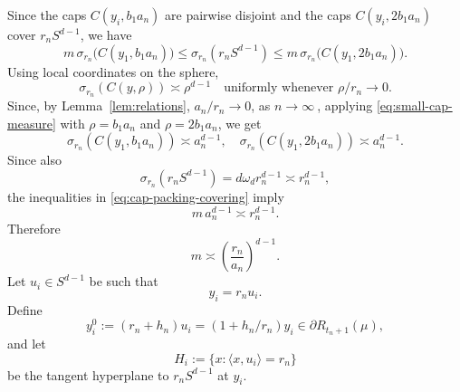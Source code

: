 \documentclass[10pt]{amsart}
\newcommand{\1}{\textbf{1}}
\numberwithin{equation}{section} %
\theoremstyle{remark}
\theoremstyle{definition}
\begin{document}
Since the caps \(C(y_i,b_1a_n)\) are pairwise disjoint and the caps \(C(y_i,2b_1a_n)\) cover \(r_nS^{d-1}\), we have
\begin{equation}\label{eq:cap-packing-covering}
m\,\sigma_{r_n}\bigl(C(y_1,b_1a_n)\bigr)
\le
\sigma_{r_n}(r_nS^{d-1})
\le
m\,\sigma_{r_n}\bigl(C(y_1,2b_1a_n)\bigr).
\end{equation}
Using local coordinates on the sphere,
\begin{equation}\label{eq:small-cap-measure}
\sigma_{r_n}(C(y,\rho))\asymp \rho^{d-1}
\quad\text{uniformly whenever } \rho/r_n\to0.
\end{equation}
Since, by Lemma~\ref{lem:relations}, $a_n/r_n \to 0$, as $ n \to \infty \ $, applying \eqref{eq:small-cap-measure} with \(\rho=b_1a_n\) and \(\rho=2b_1a_n\), we get
\[
\sigma_{r_n}(C(y_1,b_1a_n))\asymp a_n^{d-1},
\quad
\sigma_{r_n}(C(y_1,2b_1a_n))\asymp a_n^{d-1}.
\]
Since also
\[
\sigma_{r_n}(r_nS^{d-1})=d\omega_d r_n^{d-1}\asymp r_n^{d-1},
\]
the inequalities in \eqref{eq:cap-packing-covering} imply
\[
m\,a_n^{d-1}\asymp r_n^{d-1}.
\]
Therefore
\begin{equation}\label{eq:m-estimate}
m\asymp \left(\frac{r_n}{a_n}\right)^{d-1}.
\end{equation}
Let \(u_i\in S^{d-1}\) be such that
\[
y_i=r_nu_i.
\]
Define
\begin{equation}\label{eq:def-yi0} 
y_i^0:=(r_n+h_n)u_i=(1+h_n/r_n)y_i\in \partial R_{t_n+1}(\mu),
\end{equation}
and let
\[
H_i:=\{x:\langle x,u_i\rangle=r_n\}
\]
be the tangent hyperplane to \(r_nS^{d-1}\) at \(y_i\).
\end{document}
